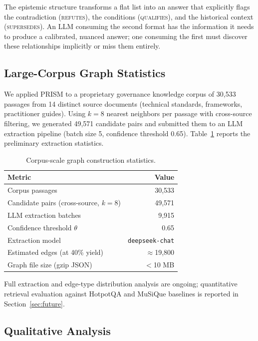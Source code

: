 \documentclass[11pt,a4paper]{article}
\begin{document}
The epistemic structure transforms a flat list into an answer that
explicitly flags the contradiction (\textsc{refutes}), the conditions
(\textsc{qualifies}), and the historical context (\textsc{supersedes}).
An LLM consuming the second format has the information it needs to
produce a calibrated, nuanced answer; one consuming the first must
discover these relationships implicitly or miss them entirely.

\subsection{Large-Corpus Graph Statistics}
\label{sec:corpus}

We applied PRISM to a proprietary governance knowledge corpus of
30,533 passages from 14 distinct source documents (technical standards,
frameworks, practitioner guides). Using $k=8$ nearest neighbors per
passage with cross-source filtering, we generated 49,571 candidate pairs
and submitted them to an LLM extraction pipeline (batch size 5,
confidence threshold 0.65). Table~\ref{tab:corpus} reports the
preliminary extraction statistics.

\begin{table}[ht]
\centering
\caption{Corpus-scale graph construction statistics.}
\label{tab:corpus}
\small
\begin{tabular}{lr}
\toprule
\textbf{Metric} & \textbf{Value} \\
\midrule
Corpus passages           & 30,533 \\
Candidate pairs (cross-source, $k=8$) & 49,571 \\
LLM extraction batches    & 9,915 \\
Confidence threshold $\theta$ & 0.65 \\
Extraction model          & \texttt{deepseek-chat} \\
Estimated edges (at 40\% yield) & $\approx$19,800 \\
Graph file size (gzip JSON) & $<$10 MB \\
\bottomrule
\end{tabular}
\end{table}

Full extraction and edge-type distribution analysis are ongoing;
quantitative retrieval evaluation against HotpotQA and MuSiQue
baselines is reported in Section~\ref{sec:future}.

\subsection{Qualitative Analysis}
\label{sec:qualitative}
\end{document}

